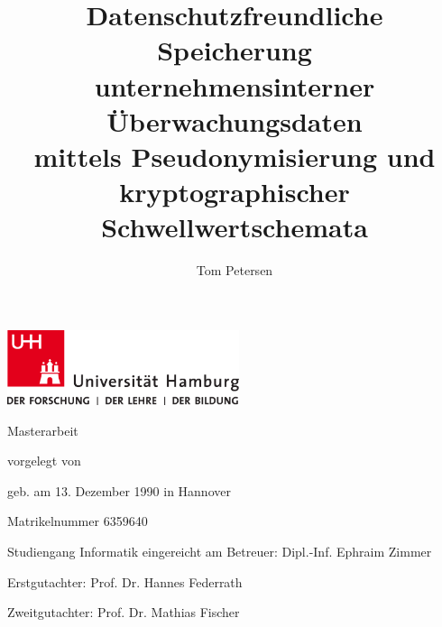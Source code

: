 \documentclass[
    fontsize=12pt,
    headings=small,
    parskip=half,           %
    bibliography=totoc,
    numbers=noenddot,       %
    open=any               %
   ,final                   %
    ]{scrreprt}
\title{Datenschutzfreundliche Speicherung\\unternehmensinterner Überwachungsdaten\\mittels Pseudonymisierung und \\kryptographischer Schwellwertschemata}
\author{Tom Petersen}
\begin{document}
\newpage
\thispagestyle{empty}
\begin{titlepage}%
\includegraphics[width=6.8cm]{./img/up-uhh-logo-u-2010-u-farbe-u-rgb.pdf}
\begin{center}\Large
	\vfill
	Masterarbeit
	\vfill
	\makeatletter
	{\Large\textsf{\textbf{\@title}}\par}
	\makeatother
	\vfill
	vorgelegt von
	\par\bigskip
	\makeatletter
	{\@author} \par
	\makeatother
	geb. am 13. Dezember 1990 in Hannover\par
	Matrikelnummer 6359640 \par
	Studiengang Informatik
	\vfill
	\makeatletter
	eingereicht am {\@date}
	\makeatother
	\vfill
	Betreuer: Dipl.-Inf. Ephraim Zimmer\par
	Erstgutachter: Prof. Dr. Hannes Federrath \par
	Zweitgutachter: Prof. Dr. Mathias Fischer\par
\end{center}
\end{titlepage}%





\listoftodos



\tableofcontents

\newpage
{}


\end{document}
